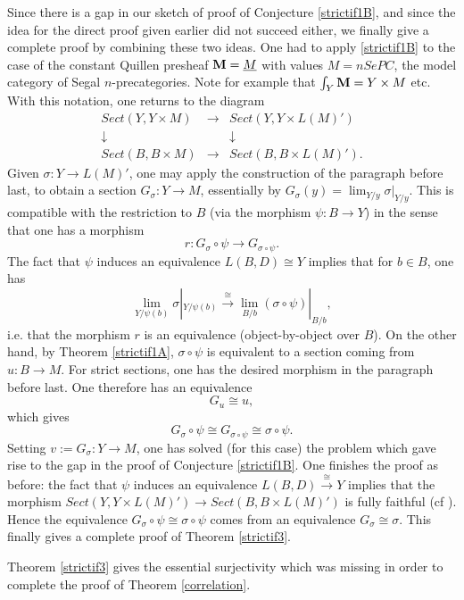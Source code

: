 Since there is a gap in our sketch of proof of
Conjecture \ref{strictif1B}, and since the idea for the direct proof given
earlier did not succeed either, we finally give a
complete proof by combining these two ideas. One had to apply
\ref{strictif1B} to the case of the constant Quillen presheaf ${\bf M} =
\underline{M}$
with values $M=nSePC$, the model category of Segal $n$-precategories.
Note for example that $\int _Y{\bf M} = Y\times M$ etc. With this notation, one
returns to the diagram
$$
\begin{array}{ccc}
Sect (Y, Y\times M ) & \rightarrow & Sect (Y, Y\times L(M )')\\
\downarrow && \downarrow \\
Sect (B, B\times M )&\rightarrow & Sect (B, B\times L(M )').
\end{array}
$$
Given $\sigma : Y\rightarrow L(M)'$,
one may apply the construction
of the paragraph before last, to obtain a section $G_{\sigma} :
Y\rightarrow
M$, essentially by $G_{\sigma}(y)= \lim _{Y/y} \sigma |_{Y/y}$. This is
compatible with the restriction to $B$ (via the morphism $\psi :
B\rightarrow Y$) in the sense that one has a morphism
$$
r:G_{\sigma} \circ  \psi \rightarrow G_{\sigma \circ \psi }.
$$
The fact that $\psi$ induces an equivalence $L(B,D)\cong Y$ implies
that for $b\in B$, one has
$$
\lim _{Y/\psi (b)}\sigma |_{Y/\psi (b)}\stackrel{\cong}{\rightarrow}
\lim _{B/b}(\sigma \circ \psi )|_{B/b},
$$
i.e. that the morphism $r$ is an equivalence (object-by-object over
$B$). On the other hand, by Theorem \ref{strictif1A}, $\sigma
\circ \psi $ is equivalent to a section coming from $u: B\rightarrow M$.
For strict sections, one has the desired morphism in the paragraph
before last. One therefore has an equivalence
$$
G_u \cong u,
$$
which gives
$$
G_{\sigma} \circ \psi \cong G_{\sigma \circ \psi} \cong \sigma \circ \psi .
$$
Setting $v:= G_{\sigma} : Y\rightarrow M$, one has solved (for this case) the
problem which gave rise to the gap in the proof of
Conjecture \ref{strictif1B}. One finishes the proof as before: the
fact that
$\psi$ induces an equivalence $L(B,D)\stackrel{\cong}{\rightarrow} Y$
implies that the morphism $Sect (Y,Y\times L(M)')\rightarrow Sect(B, B\times
L(M)')$ is fully faithful (cf \cite{DwyerKanDiags}).
Hence the equivalence $G_{\sigma}\circ \psi\cong \sigma \circ \psi$ comes
from an equivalence $G_{\sigma} \cong \sigma$.
This finally gives a complete proof of Theorem \ref{strictif3}.
\eop

Theorem \ref{strictif3} gives the essential surjectivity which was
missing
in order to complete the proof of Theorem \ref{correlation}.

